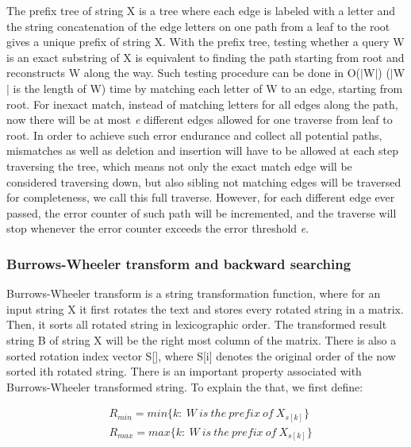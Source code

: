 The prefix tree of string X is a tree where each edge is labeled with a letter
and the string concatenation of the edge letters on one path from a leaf to the
root gives a unique prefix of string X. With the prefix tree, testing whether a
query W is an exact substring of X is equivalent to finding the path starting
from root and reconstructs W along the way. Such testing procedure can be done
in O($\mid$W$\mid$) ($\mid$W$\mid$ is the length of W) time by matching each
letter of W to an edge, starting from root. For inexact match, instead of
matching letters for all edges along the path, now there will be at most
\textit{e} different edges allowed for one traverse from leaf to root. In order
to achieve such error endurance and collect all potential paths, mismatches as
well as deletion and insertion will have to be allowed at each step traversing
the tree, which means not only the exact match edge will be considered
traversing down, but also sibling not matching edges will be traversed for
completeness, we call this full traverse. However, for each different edge
ever passed, the error counter of such path will be incremented, and the
traverse will stop whenever the error counter exceeds the error threshold
\textit{e}. 

\subsubsection{Burrows-Wheeler transform and backward searching} \label{bwt_bs}

Burrows-Wheeler transform is a string transformation function, where for an
input string X it first rotates the text and stores every rotated string in a
matrix. Then, it sorts all rotated string in lexicographic order. The
transformed result string B of string X will be the right most column of the
matrix. There is also a sorted rotation index vector S[], where S[i] denotes
the original order of the now sorted ith rotated string. There is an important
property associated with Burrows-Wheeler transformed string. To explain the
that, we first define:

\begin{small}
\begin{align*} 
&\mathit{R}_{min} = \mathit{min}\{k:\ W\ is\ the\ prefix\ of\ X_{s[k]}\} \\
&\mathit{R}_{max} = \mathit{max}\{k:\ W\ is\ the\ prefix\ of\ X_{s[k]}\} 
\end{align*}
\end{small}

